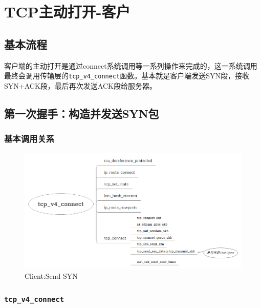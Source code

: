 \section{TCP主动打开-客户}
\label{sec:tcp_connect_client}

    \subsection{基本流程}
    \label{subsec:tcp_connect_flow}
        客户端的主动打开是通过connect系统调用等一系列操作来完成的，这一系统调用最终会调用传输层的\texttt{tcp_v4_connect}函数。基本就是客户端发送SYN段，接收SYN+ACK段，最后再次发送ACK段给服务器。

    \subsection{第一次握手：构造并发送SYN包}
    \label{subsec:tcp_connect_syn}

        \subsubsection{基本调用关系}

                \begin{figure}[htb]        
                    \centering
                    \includegraphics[width=\textwidth]  {images/Client:Send SYN.png}
					\caption{Client:Send SYN}
					\label{Client:Send SYN}
                \end{figure}            
        \subsubsection{\texttt{tcp_v4_connect}}
        	\label{Client:tcp_v4_connect}

